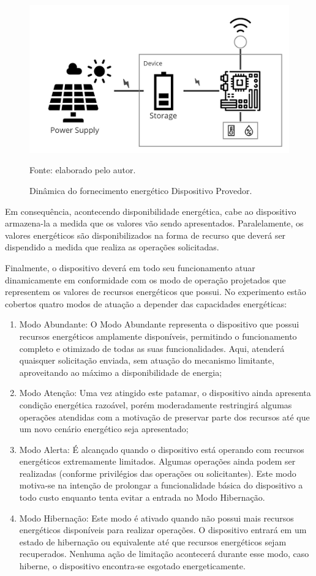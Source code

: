 \begin{figure}[H]
	\centering
	
	\caption{Dinâmica do fornecimento energético Dispositivo Provedor.}
	\label{fig:cap6dinamica}
	\noindent\includegraphics[width=0.75\linewidth]{Imagens/cap6/cap6dinamica.jpg} 
		
	Fonte: elaborado pelo autor.
\end{figure}


Em consequência, acontecendo disponibilidade energética, cabe ao dispositivo armazena-la a medida que os valores vão sendo apresentados. Paralelamente, os valores energéticos são disponibilizados na forma de recurso que deverá ser dispendido a medida que realiza as operações solicitadas.

Finalmente, o dispositivo deverá em todo seu funcionamento atuar dinamicamente em conformidade com os modo de operação projetados que representem os valores de recursos energéticos que possui. No experimento estão cobertos quatro modos de atuação a depender das capacidades energéticas:

\begin{enumerate}	
\item Modo Abundante: O Modo Abundante representa o dispositivo que possui recursos energéticos amplamente disponíveis, permitindo o funcionamento completo e otimizado de todas as suas funcionalidades. Aqui, atenderá quaisquer solicitação enviada, sem atuação do mecanismo limitante, aproveitando ao máximo a disponibilidade de energia;
\item Modo Atenção: Uma vez atingido este patamar, o dispositivo ainda apresenta condição energética razoável, porém moderadamente restringirá algumas operações atendidas com a motivação de preservar parte dos recursos até que um novo cenário energético seja apresentado;
\item Modo Alerta: É alcançado quando o dispositivo está operando com recursos energéticos extremamente limitados. Algumas operações ainda podem ser realizadas (conforme privilégios das operações ou solicitantes). Este modo motiva-se na intenção de prolongar a funcionalidade básica do dispositivo a todo custo enquanto tenta evitar a entrada no Modo Hibernação. 
\item Modo Hibernação: Este modo é ativado quando não possui mais recursos energéticos disponíveis para realizar operações. O dispositivo entrará em um estado de hibernação ou equivalente até que recursos energéticos sejam recuperados. Nenhuma ação de limitação acontecerá durante esse modo, caso hiberne,  o dispositivo encontra-se esgotado energeticamente.
\end{enumerate}

